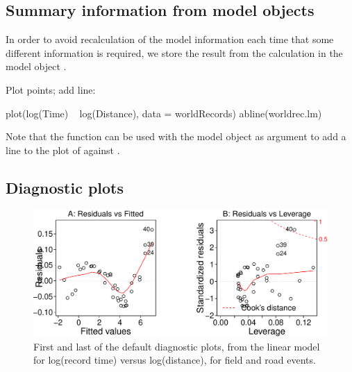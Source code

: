 \subsection{Summary information from model objects}\label{ss:sum-modobj}
In order to avoid recalculation of the model information
each time that some different information is required, we store the
result from the  calculation in the model object
.

\begin{marginfigure}
Plot points; add line:
\begin{Schunk}
\begin{Sinput}
plot(log(Time) ~ log(Distance),
     data = worldRecords)
abline(worldrec.lm)
\end{Sinput}
\end{Schunk}
\end{marginfigure}
Note that the function  can be used
  with the model object as argument to add a line to the plot of
   against .

\subsection*{Diagnostic plots}

\begin{figure}
\begin{Schunk}


\centerline{\includegraphics[width=\textwidth]{figs/03-diag12-1} }

\end{Schunk}
      \caption{First and last of the default diagnostic plots, from the
        linear model for log(record time) versus log(distance), for
        field and road events.}
\label{fig:wr-diag}
\end{figure}

